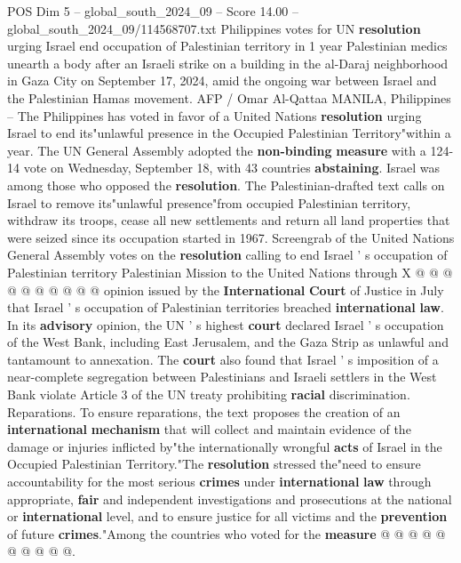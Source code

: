 \begin{textsample}{POS Dim 5 – global\_south\_2024\_09 – Score 14.00 – global\_south\_2024\_09/114568707.txt}  \label{ex:f5_pos_237}
Philippines votes for UN \textbf{resolution} urging Israel end occupation of Palestinian territory in 1 year Palestinian medics unearth a body after an Israeli strike on a building in the al-Daraj neighborhood in Gaza City on September 17, 2024, amid the ongoing war between Israel and the Palestinian Hamas movement.
AFP / Omar Al-Qattaa MANILA, Philippines -- The Philippines has voted in favor of a United Nations \textbf{resolution} urging Israel to end its"unlawful presence in the Occupied Palestinian Territory"within a year.
The UN General Assembly adopted the \textbf{non-binding} \textbf{measure} with a 124-14 vote on Wednesday, September 18, with 43 countries \textbf{abstaining}.
Israel was among those who opposed the \textbf{resolution}.
The Palestinian-drafted text calls on Israel to remove its"unlawful presence"from occupied Palestinian territory, withdraw its troops, cease all new settlements and return all land properties that were seized since its occupation started in 1967.
Screengrab of the United Nations General Assembly votes on the \textbf{resolution} calling to end Israel ' s occupation of Palestinian territory Palestinian Mission to the United Nations through X @ @ @ @ @ @ @ @ @ @ opinion issued by the \textbf{International} \textbf{Court} of Justice in July that Israel ' s occupation of Palestinian territories breached \textbf{international} \textbf{law}.
In its \textbf{advisory} opinion, the UN ' s highest \textbf{court} declared Israel ' s occupation of the West Bank, including East Jerusalem, and the Gaza Strip as unlawful and tantamount to annexation.
The \textbf{court} also found that Israel ' s imposition of a near-complete segregation between Palestinians and Israeli settlers in the West Bank violate Article 3 of the UN treaty prohibiting \textbf{racial} discrimination.
Reparations.
To ensure reparations, the text proposes the creation of an \textbf{international} \textbf{mechanism} that will collect and maintain evidence of the damage or injuries inflicted by"the internationally wrongful \textbf{acts} of Israel in the Occupied Palestinian Territory."The \textbf{resolution} stressed the"need to ensure accountability for the most serious \textbf{crimes} under \textbf{international} \textbf{law} through appropriate, \textbf{fair} and independent investigations and prosecutions at the national or \textbf{international} level, and to ensure justice for all victims and the \textbf{prevention} of future \textbf{crimes}."Among the countries who voted for the \textbf{measure} @ @ @ @ @ @ @ @ @ @.

\end{textsample}
